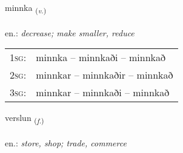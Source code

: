 \documentclass[frontgrid, backgrid]{flacards}\usepackage[]{graphicx}\usepackage[]{xcolor}
\begin{document}
\renewcommand{\flhead}{\vskip5pt \fboxsep=0pt {\small\bfseries\footnotesize Sagnorð | Verb}}
\renewcommand{\fcfoot}{\vskip5pt \fboxsep=0pt \hspace{2pt}{\small\bfseries\footnotesize 1K}}

\renewcommand{\blhead}{\vskip5pt {\small\bfseries\footnotesize Sagnorð | Verb }}
\renewcommand{\bcfoot}{\vskip5pt \hspace{2pt}{\small\bfseries\footnotesize 1K}}


{minnka \small{\textsubscript{(\textit{v.})}} \\[1ex] %
\textphonetic{[miŋ̥ka]} \\
en.: \emph{decrease; make smaller, reduce} \\  [2ex]
\renewcommand*{\arraystretch}{0.8}
\begin{tabular}{p{1cm}l}
\textsc{1sg}: & minnka -- minnkaði -- minnkað \\ 
\textsc{2sg}: & minnkar -- minnkaðir -- minnkað \\ 
\textsc{3sg}: & minnkar -- minnkaði -- minnkað \\ 
\end{tabular}
}

\renewcommand{\flhead}{\vskip5pt \fboxsep=0pt {\small\bfseries\footnotesize Nafnorð | Noun}}
\renewcommand{\fcfoot}{\vskip5pt \fboxsep=0pt \hspace{2pt}{\small\bfseries\footnotesize 1K}}

\renewcommand{\blhead}{\vskip5pt {\small\bfseries\footnotesize Nafnorð | Noun }}
\renewcommand{\bcfoot}{\vskip5pt \hspace{2pt}{\small\bfseries\footnotesize 1K}}


{verslun \small{\textsubscript{(\textit{f.})}} \\[1ex] %
 \\
en.: \emph{store, shop; trade, commerce} \\  [2ex]
\renewcommand*{\arraystretch}{0.8}
}
\end{document}
